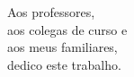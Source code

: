 \pretextualchapter{}

\vspace{8cm}

\begin{flushright}
\hfill \textnormal{
Aos professores, \\
aos colegas de curso e \\
aos meus familiares, \\
dedico este trabalho.}
\end{flushright}
